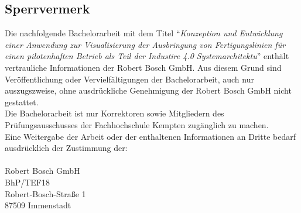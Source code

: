 \documentclass[12pt]{article}
\begin{document}
\thispagestyle{empty}
\subsection{Sperrvermerk}
Die nachfolgende Bachelorarbeit mit dem Titel "`\textit{Konzeption und Entwicklung einer Anwendung zur Visualisierung der Ausbringung von Fertigungslinien für einen pilotenhaften Betrieb als Teil der Industire 4.0 Systemarchitektu}"' enthält vertrauliche Informationen der Robert Bosch GmbH. Aus diesem Grund sind Veröffentlichung oder Vervielfältigungen der Bachelorarbeit, auch nur auszugszweise, ohne ausdrückliche Genehmigung der Robert Bosch GmbH nicht gestattet.\\
Die Bachelorarbeit ist nur Korrektoren sowie Mitgliedern des Prüfungsausschusses der Fachhochschule Kempten zugänglich zu machen. \\
Eine Weitergabe der Arbeit oder der enthaltenen Informationen an Dritte bedarf ausdrücklich der Zustimmung der: \\ \\
Robert Bosch GmbH\\
BhP/TEF18\\
Robert-Bosch-Straße 1\\
87509 Immenstadt\\
\end{document}
